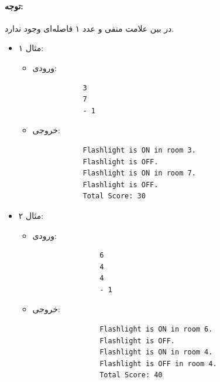 \documentclass{article}
\begin{document}
    \paragraph{توجه: } در بین علامت منفی و عدد ۱ فاصله‌ای وجود ندارد.
\begin{itemize}
    \item مثال ۱: 
    \begin{itemize}
        \item ورودی:
        \begin{LTR}
        \begin{verbatim}
            3
            7
            - 1
        \end{verbatim}
        \end{LTR}
        \item خروجی:
        \begin{LTR}
        \begin{verbatim}
            Flashlight is ON in room 3.
            Flashlight is OFF.
            Flashlight is ON in room 7.
            Flashlight is OFF.
            Total Score: 30
        \end{verbatim}
    \end{LTR}
    \end{itemize}
        \item مثال ۲:
        \begin{itemize}
            \item ورودی:
            \begin{LTR}
            \begin{verbatim}
                6
                4
                4
                - 1
            \end{verbatim}
            \end{LTR}
            \item خروجی:
            \begin{LTR}
            \begin{verbatim}
                Flashlight is ON in room 6.
                Flashlight is OFF.
                Flashlight is ON in room 4.
                Flashlight is OFF in room 4.
                Total Score: 40
            \end{verbatim}
            \end{LTR}
        \end{itemize}


\end{itemize}
\end{document}

